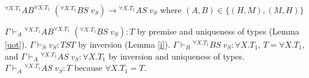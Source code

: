 \begin{case}
$^{\forall X.T_{1}}AB^{\forall X.T_{1}}\;(^{\forall X.T_{1}}BS\;v_{S})\rightarrow{^{\forall X.T_{1}}A}S\;v_{S}$ where $(A,B)\in\lbrace(H,M),(M,H)\rbrace$

$\Gamma\vdash_{A}{^{\forall X.T_{1}}A}B^{\forall X.T_{1}}\;(^{\forall X.T_{1}}BS\;v_{S}):T$ by premise and uniqueness of types (Lemma \ref{uot}).  $\Gamma\vdash_{S}v_{S}:TST$ by inversion (Lemma \ref{i}).  $\Gamma\vdash_{B}{^{\forall X.T_{1}}B}S\;v_{S}:\forall X.T_{1}$, $T=\forall X.T_{1}$, and $\Gamma\vdash_{A}{^{\forall X.T_{1}}A}S\;v_{S}:\forall X.T_{1}$ by inversion and uniqueness of types.  $\Gamma\vdash_{A}{^{\forall X.T_{1}}A}S\;v_{S}:T$ because $\forall X.T_{1}=T$.
\end{case}